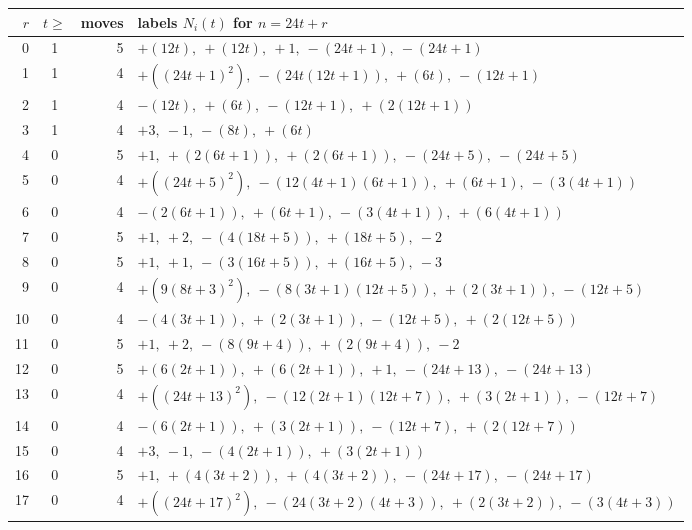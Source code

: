 {\footnotesize\begin{longtable}{@{}rcrp{}@{}}\toprule
$r$ & $t\ge$ & moves & labels $N_i(t)$ for $n=24t+r$\\\midrule\endhead
0 & 1 & 5 & $+(12 t),\ +(12 t),\ +1,\ -(24 t + 1),\ -(24 t + 1)$ \\
1 & 1 & 4 & $+(\left(24 t + 1\right)^{2}),\ -(24 t \left(12 t + 1\right)),\ +(6 t),\ -(12 t + 1)$ \\
2 & 1 & 4 & $-(12 t),\ +(6 t),\ -(12 t + 1),\ +(2 \left(12 t + 1\right))$ \\
3 & 1 & 4 & $+3,\ -1,\ -(8 t),\ +(6 t)$ \\
4 & 0 & 5 & $+1,\ +(2 \left(6 t + 1\right)),\ +(2 \left(6 t + 1\right)),\ -(24 t + 5),\ -(24 t + 5)$ \\
5 & 0 & 4 & $+(\left(24 t + 5\right)^{2}),\ -(12 \left(4 t + 1\right) \left(6 t + 1\right)),\ +(6 t + 1),\ -(3 \left(4 t + 1\right))$ \\
6 & 0 & 4 & $-(2 \left(6 t + 1\right)),\ +(6 t + 1),\ -(3 \left(4 t + 1\right)),\ +(6 \left(4 t + 1\right))$ \\
7 & 0 & 5 & $+1,\ +2,\ -(4 \left(18 t + 5\right)),\ +(18 t + 5),\ -2$ \\
8 & 0 & 5 & $+1,\ +1,\ -(3 \left(16 t + 5\right)),\ +(16 t + 5),\ -3$ \\
9 & 0 & 4 & $+(9 \left(8 t + 3\right)^{2}),\ -(8 \left(3 t + 1\right) \left(12 t + 5\right)),\ +(2 \left(3 t + 1\right)),\ -(12 t + 5)$ \\
10 & 0 & 4 & $-(4 \left(3 t + 1\right)),\ +(2 \left(3 t + 1\right)),\ -(12 t + 5),\ +(2 \left(12 t + 5\right))$ \\
11 & 0 & 5 & $+1,\ +2,\ -(8 \left(9 t + 4\right)),\ +(2 \left(9 t + 4\right)),\ -2$ \\
12 & 0 & 5 & $+(6 \left(2 t + 1\right)),\ +(6 \left(2 t + 1\right)),\ +1,\ -(24 t + 13),\ -(24 t + 13)$ \\
13 & 0 & 4 & $+(\left(24 t + 13\right)^{2}),\ -(12 \left(2 t + 1\right) \left(12 t + 7\right)),\ +(3 \left(2 t + 1\right)),\ -(12 t + 7)$ \\
14 & 0 & 4 & $-(6 \left(2 t + 1\right)),\ +(3 \left(2 t + 1\right)),\ -(12 t + 7),\ +(2 \left(12 t + 7\right))$ \\
15 & 0 & 4 & $+3,\ -1,\ -(4 \left(2 t + 1\right)),\ +(3 \left(2 t + 1\right))$ \\
16 & 0 & 5 & $+1,\ +(4 \left(3 t + 2\right)),\ +(4 \left(3 t + 2\right)),\ -(24 t + 17),\ -(24 t + 17)$ \\
17 & 0 & 4 & $+(\left(24 t + 17\right)^{2}),\ -(24 \left(3 t + 2\right) \left(4 t + 3\right)),\ +(2 \left(3 t + 2\right)),\ -(3 \left(4 t + 3\right))$ \\

\end{longtable}}
